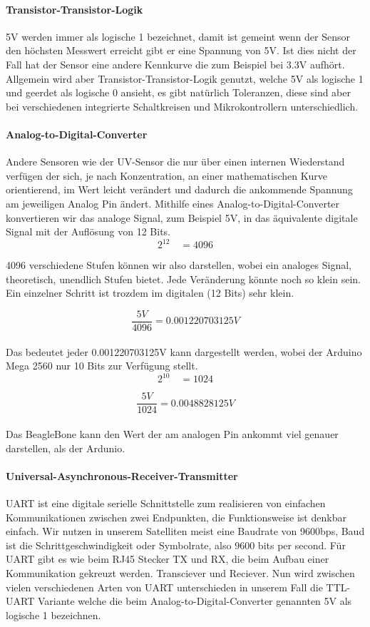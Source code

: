 \paragraph{Transistor-Transistor-Logik}
5V werden immer als logische 1 bezeichnet, damit ist gemeint wenn der Sensor den höchsten Messwert erreicht gibt er eine Spannung von 5V. Ist dies nicht der Fall hat der Sensor eine andere Kennkurve die zum Beispiel bei 3.3V aufhört. Allgemein wird aber Transistor-Transistor-Logik genutzt, welche 5V als logische 1 und geerdet als logische 0 ansieht, es gibt natürlich Toleranzen, diese sind aber bei verschiedenen integrierte Schaltkreisen und Mikrokontrollern unterschiedlich.

\paragraph{Analog-to-Digital-Converter}
Andere Sensoren wie der UV-Sensor die nur über einen internen Wiederstand verfügen der sich, je nach Konzentration, an einer mathematischen Kurve orientierend, im Wert leicht verändert und dadurch die ankommende Spannung am jeweiligen Analog Pin ändert. Mithilfe eines Analog-to-Digital-Converter konvertieren wir das analoge Signal, zum Beispiel 5V, in das äquivalente digitale Signal mit der Auflösung von 12 Bits. \\

\[
2^{12} \quad = 4096
\]

4096 verschiedene Stufen können wir also darstellen, wobei ein analoges Signal, theoretisch, unendlich Stufen bietet. Jede Veränderung könnte noch so klein sein. Ein einzelner Schritt ist trozdem im digitalen (12 Bits) sehr klein.

\[
\frac{5V}{4096} = 0.001220703125 V
\] \\

Das bedeutet jeder 0.001220703125V kann dargestellt werden, wobei der Arduino Mega 2560 nur 10 Bits zur Verfügung stellt. \\

\[
2^{10} \quad = 1024
\]

\[
\frac{5V}{1024} = 0.0048828125V
\] \\

Das BeagleBone kann den Wert der am analogen Pin ankommt viel genauer darstellen, als der Ardunio. 

\paragraph{Universal-Asynchronous-Receiver-Transmitter}
UART ist eine digitale serielle Schnittstelle zum realisieren von einfachen Kommunikationen zwischen zwei Endpunkten, die Funktionsweise ist denkbar einfach. Wir nutzen in unserem Satelliten meist eine Baudrate von 9600bps, Baud ist die Schrittgeschwindigkeit oder Symbolrate, also 9600 bits per second. Für UART gibt es wie beim RJ45 Stecker TX und RX, die beim Aufbau einer Kommunikation gekreuzt werden. Transciever und Reciever. Nun wird zwischen vielen verschiedenen Arten von UART unterschieden in unserem Fall die TTL-UART Variante welche die beim Analog-to-Digital-Converter genannten 5V als logische 1 bezeichnen. \\

